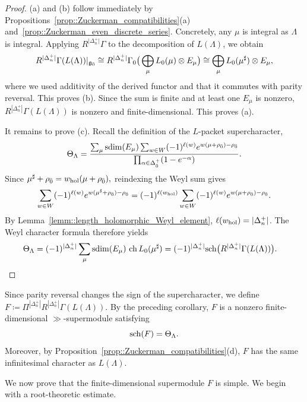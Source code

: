 \begin{proof}
(a) and (b) follow immediately by Propositions~\ref{prop::Zuckerman_compatibilities}(a) and~\ref{prop::Zuckerman_even_discrete_series}. Concretely, any $\mu$ is integral as $\Lambda$ is integral. Applying $R^{\vert \Delta_{n}^{+}\vert}\Gamma$ to the decomposition of $L(\Lambda)$, we obtain
\[
\begin{aligned}
R^{|\Delta_n^+|}\Gamma(L(\Lambda))|_{{\mathfrak{g}_{\bar{0}}}}
\cong
R^{|\Delta_n^+|}\Gamma_0
\big(
\bigoplus_\mu L_0(\mu)\otimes E_\mu
\big)\cong
\bigoplus_\mu L_0(\mu^\sharp)\otimes E_\mu,
\end{aligned}
\]
where we used additivity of the derived functor and that it commutes with parity reversal. This proves (b). Since the sum is finite and at least one $E_\mu$ is nonzero, $R^{|\Delta_n^+|}\Gamma(L(\Lambda))$ is nonzero and finite-dimensional. This proves (a).

It remains to prove (c). Recall the definition of the $L$-packet supercharacter,
\[
\Theta_\Lambda
=
\frac{
\sum_\mu \operatorname{sdim}(E_\mu)
\sum_{w\in W}(-1)^{\ell(w)}
e^{w(\mu+\rho_{\bar0})-\rho_{\bar0}}
}{
\prod_{\alpha\in\Delta_{\bar0}^+}
(1-e^{-\alpha})
}.
\]
Since
$
\mu^\sharp+\rho_{\bar0}
=
w_{\operatorname{hol}}(\mu+\rho_{\bar0}),
$
reindexing the Weyl sum gives
\[
\begin{aligned}
\sum_{w\in W}(-1)^{\ell(w)}
e^{w(\mu^\sharp+\rho_{\bar0})-\rho_{\bar0}}=
(-1)^{\ell(w_{\operatorname{hol}})}
\sum_{w\in W}(-1)^{\ell(w)}
e^{w(\mu+\rho_{\bar0})-\rho_{\bar0}}.
\end{aligned}
\]
By Lemma~\ref{lemm::length_holomorphic_Weyl_element}, $\ell(w_{\operatorname{hol}})=|\Delta_n^+|$. The Weyl character formula therefore yields
\[
\begin{aligned}
\Theta_\Lambda
&=
(-1)^{|\Delta_n^+|}
\sum_\mu \operatorname{sdim}(E_\mu)\,\operatorname{ch} L_0(\mu^\sharp)=
(-1)^{|\Delta_n^+|}
{\operatorname{sch}}\bigl(R^{|\Delta_n^+|}\Gamma(L(\Lambda))\bigr).
\end{aligned}\qedhere
\]
\end{proof}


Since parity reversal changes the sign of the supercharacter, we define
$
F\coloneqq\Pi^{|\Delta_n^+|}R^{|\Delta_n^+|}\Gamma(L(\Lambda)).
$
By the preceding corollary, $F$ is a nonzero finite-dimensional $\gg$-supermodule satisfying
\begin{equation}
{\operatorname{sch}}(F)=\Theta_\Lambda.
\end{equation}
Moreover, by Proposition~\ref{prop::Zuckerman_compatibilities}(d), $F$ has the same infinitesimal character as $L(\Lambda)$. 

We now prove that the finite-dimensional supermodule $F$ is simple. We begin with a root-theoretic estimate.

